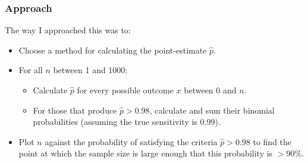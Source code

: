 \documentclass{beamer}\usepackage{knitr}
\begin{document}
\begin{frame}
\frametitle{Approach}

The way I approached this was to:
\begin{itemize}
  \item Choose a method for calculating the point-estimate $\hat{p}$.
  \item For all $n$ between 1 and 1000:
  \begin{itemize}
    \item Calculate $\hat{p}$ for every possible outcome $x$ between $0$ and $n$.
    \item For those that produce $\hat{p} > 0.98$, calculate and sum their binomial probabilities (assuming the true sensitivity is $0.99$).
  \end{itemize}
  \item Plot $n$ against the probability of satisfying the criteria $\hat{p} > 0.98$ to find the point at which the sample size is large enough that this probability is $> 90\%$. 
\end{itemize}

\end{frame}

% 
% 
\end{document}
